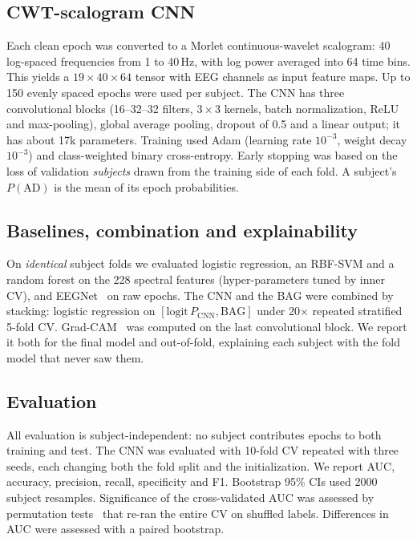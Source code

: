 \documentclass[conference]{IEEEtran}
\begin{document}
\subsection{CWT-scalogram CNN}
Each clean epoch was converted to a Morlet continuous-wavelet scalogram: 40 log-spaced frequencies from 1 to 40\,Hz, with log power averaged into 64 time bins. This yields a $19\times40\times64$ tensor with EEG channels as input feature maps. Up to 150 evenly spaced epochs were used per subject. The CNN has three convolutional blocks (16--32--32 filters, $3\times3$ kernels, batch normalization, ReLU and max-pooling), global average pooling, dropout of 0.5 and a linear output; it has about 17k parameters. Training used Adam (learning rate $10^{-3}$, weight decay $10^{-3}$) and class-weighted binary cross-entropy. Early stopping was based on the loss of validation \emph{subjects} drawn from the training side of each fold. A subject's $P(\mathrm{AD})$ is the mean of its epoch probabilities.

\subsection{Baselines, combination and explainability}
On \emph{identical} subject folds we evaluated logistic regression, an RBF-SVM and a random forest on the 228 spectral features (hyper-parameters tuned by inner CV), and EEGNet~\cite{eegnet} on raw epochs. The CNN and the BAG were combined by stacking: logistic regression on $[\mathrm{logit}\,P_\mathrm{CNN},\mathrm{BAG}]$ under 20$\times$ repeated stratified 5-fold CV. Grad-CAM~\cite{gradcam} was computed on the last convolutional block. We report it both for the final model and out-of-fold, explaining each subject with the fold model that never saw them.

\subsection{Evaluation}
All evaluation is subject-independent: no subject contributes epochs to both training and test. The CNN was evaluated with 10-fold CV repeated with three seeds, each changing both the fold split and the initialization. We report AUC, accuracy, precision, recall, specificity and F1. Bootstrap 95\% CIs used 2000 subject resamples. Significance of the cross-validated AUC was assessed by permutation tests~\cite{ojala2010} that re-ran the entire CV on shuffled labels. Differences in AUC were assessed with a paired bootstrap.
\end{document}

